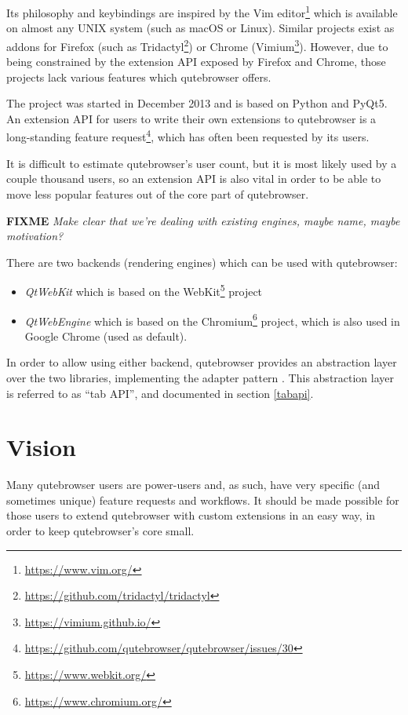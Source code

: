 \documentclass[a4paper,parskip=full]{scrreprt}
\newcommand{\fixme}[1]{\textbf{FIXME} \emph{#1}}
\begin{document}
Its philosophy and keybindings are inspired by the Vim
editor\footnote{\url{https://www.vim.org/}} which is available on almost any
UNIX system (such as macOS or Linux). Similar projects exist as addons for
Firefox (such as Tridactyl\footnote{\url{https://github.com/tridactyl/tridactyl}})
or Chrome (Vimium\footnote{\url{https://vimium.github.io/}}). However, due to
being constrained by the extension API exposed by Firefox and Chrome, those
projects lack various features which qutebrowser offers.

The project was started in December 2013 and is based on Python and PyQt5. An
extension API for users to write their own extensions to qutebrowser is a
long-standing feature
request\footnote{\url{https://github.com/qutebrowser/qutebrowser/issues/30}},
which has often been requested by its users.

It is difficult to estimate qutebrowser's user count, but it is most likely used by a
couple thousand users, so an extension API is also vital in order to be able to move
less popular features out of the core part of qutebrowser.

\fixme{Make clear that we're dealing with existing engines, maybe name, maybe motivation?}

\label{backends}
There are two backends (rendering engines) which can be used with qutebrowser:

\begin{itemize}
  \item \emph{QtWebKit} which is based on the
  WebKit\footnote{\url{https://www.webkit.org/}} project
  \item \emph{QtWebEngine} which is based on the
  Chromium\footnote{\url{https://www.chromium.org/}} project, which is also used
  in Google Chrome (used as default).
\end{itemize}

In order to allow using either backend, qutebrowser provides an abstraction
layer over the two libraries, implementing the adapter pattern
\autocite[139ff]{gof}. This abstraction layer is referred to as ``tab API'', and
documented in section \ref{tabapi}.

\section{Vision}
\label{vision}

Many qutebrowser users are power-users and, as such, have very specific (and
sometimes unique) feature requests and workflows. It should be made possible for
those users to extend qutebrowser with custom extensions in an easy way, in order
to keep qutebrowser's core small.
\end{document}
